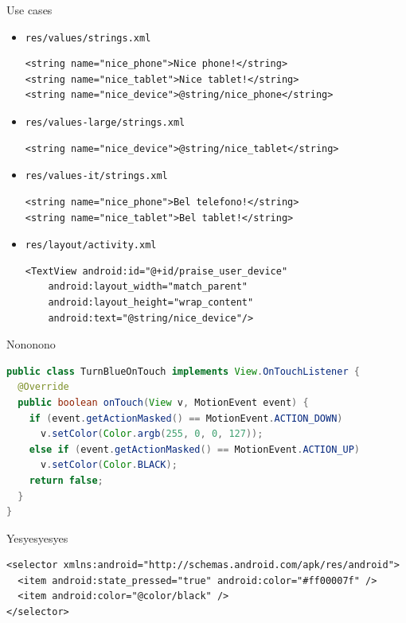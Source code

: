 \documentclass{beamer}
\begin{document}
\begin{frame}[fragile]{Use cases}
\begin{itemize}
\item \texttt{res/values/strings.xml}
\begin{lstlisting}
<string name="nice_phone">Nice phone!</string>
<string name="nice_tablet">Nice tablet!</string>
<string name="nice_device">@string/nice_phone</string>
\end{lstlisting}
\item \texttt{res/values-large/strings.xml}
\begin{lstlisting}
<string name="nice_device">@string/nice_tablet</string>
\end{lstlisting}
\item \texttt{res/values-it/strings.xml}
\begin{lstlisting}
<string name="nice_phone">Bel telefono!</string>
<string name="nice_tablet">Bel tablet!</string>
\end{lstlisting}
\item \texttt{res/layout/activity.xml}
\begin{lstlisting}
<TextView android:id="@+id/praise_user_device"
    android:layout_width="match_parent"
    android:layout_height="wrap_content"
    android:text="@string/nice_device"/>
\end{lstlisting}
\end{itemize}
\end{frame}

\begin{frame}[fragile]{Nononono}
\begin{lstlisting}[language=Java]
public class TurnBlueOnTouch implements View.OnTouchListener {
  @Override
  public boolean onTouch(View v, MotionEvent event) {
    if (event.getActionMasked() == MotionEvent.ACTION_DOWN)
      v.setColor(Color.argb(255, 0, 0, 127));
    else if (event.getActionMasked() == MotionEvent.ACTION_UP)
      v.setColor(Color.BLACK);
    return false;
  }
}
\end{lstlisting}
\end{frame}

\begin{frame}[fragile]{Yesyesyesyes}
\begin{lstlisting}
<selector xmlns:android="http://schemas.android.com/apk/res/android">
  <item android:state_pressed="true" android:color="#ff00007f" />
  <item android:color="@color/black" />
</selector>
\end{lstlisting}
\end{frame}
\end{document}
